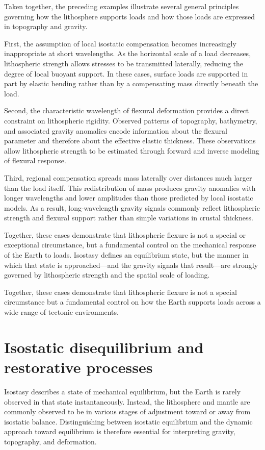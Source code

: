 Taken together, the preceding examples illustrate several general principles governing how the lithosphere supports loads and how those loads are expressed in topography and gravity.

First, the assumption of local isostatic compensation becomes increasingly inappropriate at short wavelengths. As the horizontal scale of a load decreases, lithospheric strength allows stresses to be transmitted laterally, reducing the degree of local buoyant support. In these cases, surface loads are supported in part by elastic bending rather than by a compensating mass directly beneath the load.

Second, the characteristic wavelength of flexural deformation provides a direct constraint on lithospheric rigidity. Observed patterns of topography, bathymetry, and associated gravity anomalies encode information about the flexural parameter and therefore about the effective elastic thickness. These observations allow lithospheric strength to be estimated through forward and inverse modeling of flexural response.

Third, regional compensation spreads mass laterally over distances much larger than the load itself. This redistribution of mass produces gravity anomalies with longer wavelengths and lower amplitudes than those predicted by local isostatic models. As a result, long-wavelength gravity signals commonly reflect lithospheric strength and flexural support rather than simple variations in crustal thickness.

Together, these cases demonstrate that lithospheric flexure is not a special or exceptional circumstance, but a fundamental control on the mechanical response of the Earth to loads. Isostasy defines an equilibrium state, but the manner in which that state is approached—and the gravity signals that result—are strongly governed by lithospheric strength and the spatial scale of loading.

Together, these cases demonstrate that lithospheric flexure is not a special circumstance but a fundamental control on how the Earth supports loads across a wide range of tectonic environments.


\section{Isostatic disequilibrium and restorative processes}

Isostasy describes a state of mechanical equilibrium, but the Earth is rarely observed in that state instantaneously. Instead, the lithosphere and mantle are commonly observed to be in various stages of adjustment toward or away from isostatic balance. Distinguishing between isostatic equilibrium and the dynamic approach toward equilibrium is therefore essential for interpreting gravity, topography, and deformation.

